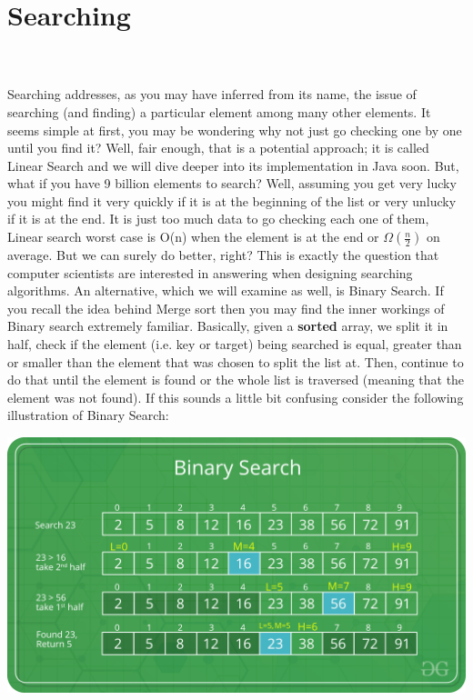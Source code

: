 \documentclass[letterpaper, 10pt]{article}
\begin{document}
\section{Searching}
\\
\\
Searching addresses, as you may have inferred from its name, the issue of searching (and finding) a particular element among many other elements. It seems simple at first, you may be wondering why not just go checking one by one until you find it? Well, fair enough, that is a potential approach; it is called Linear Search and we will dive deeper into its implementation in Java soon. But, what if you have 9 billion elements to search? Well, assuming you get very lucky you might find it very quickly if it is at the beginning of the list or very unlucky if it is at the end. It is just too much data to go checking each one of them, Linear search worst case is O(n) when the element is at the end or $\Omega (\frac{n}{2})$ on average. But we can surely do better, right? This is exactly the question that computer scientists are interested in answering when designing searching algorithms. An alternative, which we will examine as well, is Binary Search. If you recall the idea behind Merge sort then you may find the inner workings of Binary search extremely familiar. Basically, given a \textbf{sorted} array, we split it in half, check if the element (i.e. key or target) being searched is equal, greater than or smaller than the element that was chosen to split the list at. Then, continue to do that until the element is found or the whole list is traversed (meaning that the element was not found). If this sounds a little bit confusing consider the following illustration of Binary Search:
\\
\begin{center}
    \includegraphics[scale=0.20]{images/Binary-Search.png}
\end{center}
\end{document}
